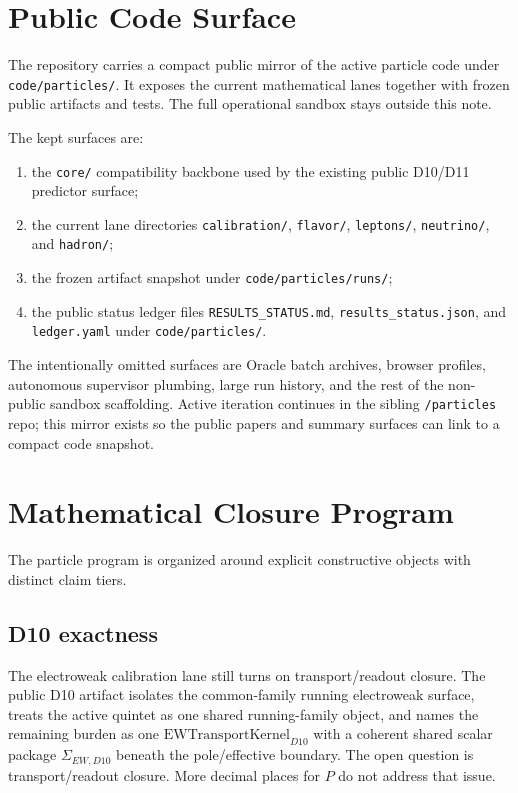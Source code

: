 \documentclass[11pt]{article}
\begin{document}
\section{Public Code Surface}

The repository carries a compact public mirror of the active particle code
under \texttt{code/particles/}. It exposes the current mathematical lanes
together with frozen public artifacts and tests. The full operational sandbox
stays outside this note.

The kept surfaces are:
\begin{enumerate}[leftmargin=2em]
\item the \texttt{core/} compatibility backbone used by the existing public
D10/D11 predictor surface;
\item the current lane directories
\texttt{calibration/}, \texttt{flavor/}, \texttt{leptons/},
\texttt{neutrino/}, and \texttt{hadron/};
\item the frozen artifact snapshot under \texttt{code/particles/runs/};
\item the public status ledger files \texttt{RESULTS\_STATUS.md},
\texttt{results\_status.json}, and \texttt{ledger.yaml} under
\texttt{code/particles/}.
\end{enumerate}

The intentionally omitted surfaces are Oracle batch archives, browser profiles,
autonomous supervisor plumbing, large run history, and the rest of the
non-public sandbox scaffolding. Active iteration continues in the sibling
\texttt{/particles} repo; this mirror exists so the public papers and summary
surfaces can link to a compact code snapshot.

\section{Mathematical Closure Program}

The particle program is organized around explicit constructive objects with
distinct claim tiers.

\subsection{D10 exactness}

The electroweak calibration lane still turns on transport/readout closure. The
public D10 artifact isolates the common-family
running electroweak surface, treats the active quintet as one shared
running-family object, and names the remaining burden as one
\(\mathrm{EWTransportKernel}_{D10}\) with a coherent shared scalar package
\(\Sigma_{EW,D10}\) beneath the pole/effective boundary. The open question is
transport/readout closure. More decimal places for \(P\) do not address that
issue.
\end{document}
